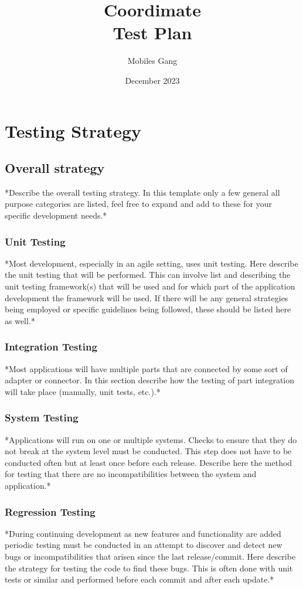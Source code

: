 \documentclass{article}
\title{Coordimate\\Test Plan}
\date{December 2023}
\author{Mobiles Gang}
\begin{document}
\maketitle

\section{Testing Strategy}

\subsection{Overall strategy} *Describe the overall testing strategy. In this
template only a few general all purpose categories are listed, feel free to
expand and add to these for your specific development needs.*

\subsubsection{Unit Testing} *Most development, especially in an agile setting,
uses unit testing. Here describe the unit testing that will be performed. This
can involve list and describing the unit testing framework(s) that will be used
and for which part of the application development the framework will be used.
If there will be any general strategies being employed or specific guidelines
being followed, these should be listed here as well.*

\subsubsection{Integration Testing  } *Most applications will have multiple
parts that are connected by some sort of adapter or connector. In this section
describe how the testing of part integration will take place (manually, unit
tests, etc.).*

\subsubsection{System Testing} *Applications will run on one or multiple
systems. Checks to ensure that they do not break at the system level must be
conducted. This step does not have to be conducted often but at least once
before each release. Describe here the method for testing that there are no
incompatibilities between the system and application.*

\subsubsection{Regression Testing} *During continuing development as new
features and functionality are added periodic testing must be conducted in an
attempt to discover and detect new bugs or incompatibilities that arisen since
the last release/commit. Here describe the strategy for testing the code to
find these bugs. This is often done with unit tests or similar and performed
before each commit and after each update.*
\end{document}
